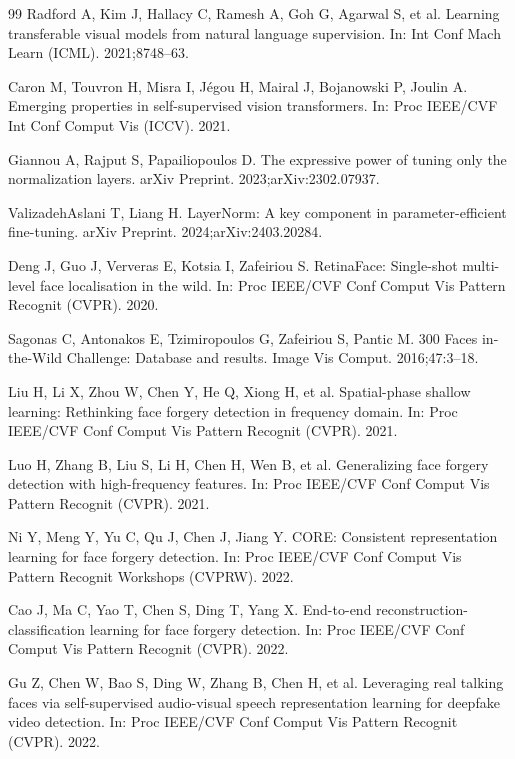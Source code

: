 \documentclass[fonts]{icst}
\begin{document}
\begin{thebibliography}{99}
Radford A, Kim J, Hallacy C, Ramesh A, Goh G, Agarwal S, et al.
Learning transferable visual models from natural language supervision.
In: Int Conf Mach Learn (ICML). 2021;8748–63.


Caron M, Touvron H, Misra I, J{\'e}gou H, Mairal J, Bojanowski P, Joulin A.
Emerging properties in self-supervised vision transformers.
In: Proc IEEE/CVF Int Conf Comput Vis (ICCV). 2021.

Giannou A, Rajput S, Papailiopoulos D.
The expressive power of tuning only the normalization layers.
arXiv Preprint. 2023;arXiv:2302.07937.

ValizadehAslani T, Liang H.
LayerNorm: A key component in parameter-efficient fine-tuning.
arXiv Preprint. 2024;arXiv:2403.20284.

Deng J, Guo J, Ververas E, Kotsia I, Zafeiriou S.
RetinaFace: Single-shot multi-level face localisation in the wild.
In: Proc IEEE/CVF Conf Comput Vis Pattern Recognit (CVPR). 2020.

Sagonas C, Antonakos E, Tzimiropoulos G, Zafeiriou S, Pantic M.
300 Faces in-the-Wild Challenge: Database and results.
Image Vis Comput. 2016;47:3–18.

Liu H, Li X, Zhou W, Chen Y, He Q, Xiong H, et al.
Spatial-phase shallow learning: Rethinking face forgery detection in frequency domain.
In: Proc IEEE/CVF Conf Comput Vis Pattern Recognit (CVPR). 2021.

Luo H, Zhang B, Liu S, Li H, Chen H, Wen B, et al.
Generalizing face forgery detection with high-frequency features.
In: Proc IEEE/CVF Conf Comput Vis Pattern Recognit (CVPR). 2021.

Ni Y, Meng Y, Yu C, Qu J, Chen J, Jiang Y.
CORE: Consistent representation learning for face forgery detection.
In: Proc IEEE/CVF Conf Comput Vis Pattern Recognit Workshops (CVPRW). 2022.

Cao J, Ma C, Yao T, Chen S, Ding T, Yang X.
End-to-end reconstruction-classification learning for face forgery detection.
In: Proc IEEE/CVF Conf Comput Vis Pattern Recognit (CVPR). 2022.

Gu Z, Chen W, Bao S, Ding W, Zhang B, Chen H, et al.
Leveraging real talking faces via self-supervised audio-visual speech representation learning for deepfake video detection.
In: Proc IEEE/CVF Conf Comput Vis Pattern Recognit (CVPR). 2022.


\end{thebibliography}
\end{document}
